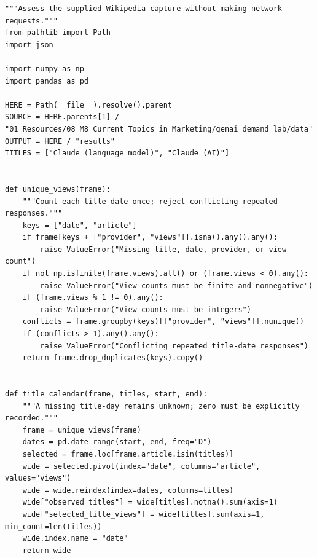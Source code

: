 \begin{Verbatim}[breaklines,breakanywhere,fontsize=\small]
"""Assess the supplied Wikipedia capture without making network requests."""
from pathlib import Path
import json

import numpy as np
import pandas as pd

HERE = Path(__file__).resolve().parent
SOURCE = HERE.parents[1] / "01_Resources/08_M8_Current_Topics_in_Marketing/genai_demand_lab/data"
OUTPUT = HERE / "results"
TITLES = ["Claude_(language_model)", "Claude_(AI)"]


def unique_views(frame):
    """Count each title-date once; reject conflicting repeated responses."""
    keys = ["date", "article"]
    if frame[keys + ["provider", "views"]].isna().any().any():
        raise ValueError("Missing title, date, provider, or view count")
    if not np.isfinite(frame.views).all() or (frame.views < 0).any():
        raise ValueError("View counts must be finite and nonnegative")
    if (frame.views % 1 != 0).any():
        raise ValueError("View counts must be integers")
    conflicts = frame.groupby(keys)[["provider", "views"]].nunique()
    if (conflicts > 1).any().any():
        raise ValueError("Conflicting repeated title-date responses")
    return frame.drop_duplicates(keys).copy()


def title_calendar(frame, titles, start, end):
    """A missing title-day remains unknown; zero must be explicitly recorded."""
    frame = unique_views(frame)
    dates = pd.date_range(start, end, freq="D")
    selected = frame.loc[frame.article.isin(titles)]
    wide = selected.pivot(index="date", columns="article", values="views")
    wide = wide.reindex(index=dates, columns=titles)
    wide["observed_titles"] = wide[titles].notna().sum(axis=1)
    wide["selected_title_views"] = wide[titles].sum(axis=1, min_count=len(titles))
    wide.index.name = "date"
    return wide



\end{Verbatim}
